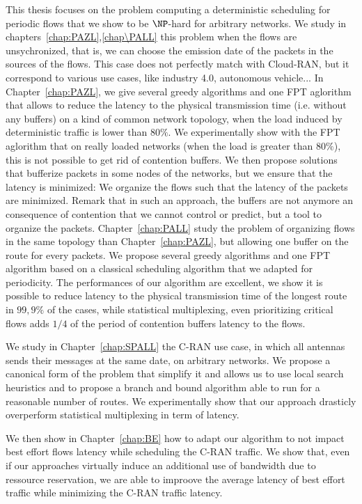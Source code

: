  This thesis focuses on the problem computing a deterministic scheduling for periodic flows that we show to be $\NP$-hard for arbitrary networks.
 We study in chapters~\ref{chap:PAZL},\ref{chap\PALL} this problem when the flows are unsychronized, that is, we can choose the emission date of the packets in the sources of the flows. This case does not perfectly match with Cloud-RAN, but it correspond to various use cases, like industry 4.0, autonomous vehicle...
In Chapter~\ref{chap:PAZL}, we give several greedy algorithms and one FPT aglorithm that allows to reduce the latency to the physical transmission time (i.e. without any buffers) on a kind of common network topology, when the load induced by deterministic traffic is lower than $80\%$. We experimentally show with the FPT aglorithm that on really loaded networks (when the load is greater than $80\%$), this is not possible to get rid of contention buffers. 
We then propose solutions that bufferize packets in some nodes of the networks, but we ensure that the latency is minimized: We organize the flows such that the latency of the packets are minimized. Remark that in such an approach, the buffers are not anymore an consequence of contention that we cannot control or predict, but a tool to organize the packets.
Chapter~\ref{chap:PALL} study the problem of organizing flows in the same topology than Chapter~\ref{chap:PAZL}, but allowing one buffer on the route for every packets. We propose several greedy algorithms and one FPT algorithm based on a classical scheduling algorithm that we adapted for periodicity. The performances of our algorithm are excellent, we show it is possible to reduce latency to the physical transmission time of the longest route in $99,9\%$ of the cases, while statistical multiplexing, even prioritizing critical flows adds $1/4$ of the period of contention buffers latency to the flows.

We study in Chapter~\ref{chap:SPALL} the C-RAN use case, in which all antennas sends their messages at the same date, on arbitrary networks. We propose a canonical form of the problem that simplify it and allows us to use local search heuristics and to propose a branch and bound algorithm able to run for a reasonable number of routes. We experimentally show that our approach drasticly overperform statistical multiplexing in term of latency.

We then show in Chapter~\ref{chap:BE} how to adapt our algorithm to not impact best effort flows latency while scheduling the C-RAN traffic. We show that, even if our approaches virtually induce an additional use of bandwidth due to ressource reservation, we are able to improove the average latency of best effort traffic while minimizing the C-RAN traffic latency.

